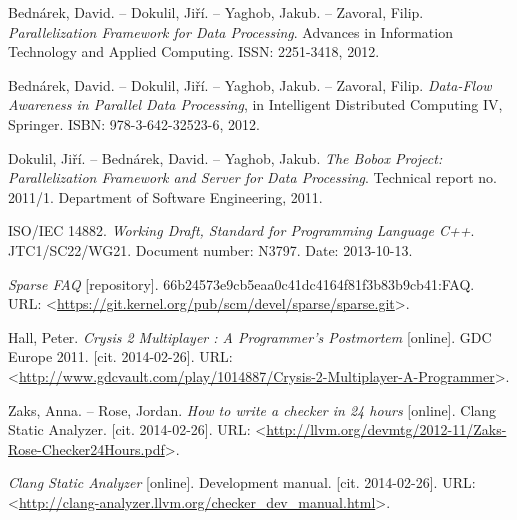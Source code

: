 
\def\bibname{References}
\begin{thebibliography}{99}
\addcontentsline{toc}{chapter}{\bibname}


	{\sc Bednárek}, David. -- {\sc Dokulil}, Jiří. -- {\sc Yaghob}, Jakub. -- {\sc Zavoral}, Filip.
	\emph{Parallelization Framework for Data Processing}.
	Advances in Information Technology and Applied Computing.
	ISSN: 2251-3418, 2012.
	
	{\sc Bednárek}, David. -- {\sc Dokulil}, Jiří. -- {\sc Yaghob}, Jakub. -- {\sc Zavoral}, Filip.
	\emph{Data-Flow Awareness in Parallel Data Processing},
	in Intelligent Distributed Computing IV, Springer.
	ISBN: 978-3-642-32523-6, 2012.

	{\sc Dokulil}, Jiří. -- {\sc Bednárek}, David. -- {\sc Yaghob}, Jakub.
	\emph{The Bobox Project: Parallelization Framework and Server for Data Processing}.
	Technical report no. 2011/1.
	Department of Software Engineering, 2011.
	
	ISO/IEC 14882.
	\emph{Working Draft, Standard for Programming Language C++}.
	JTC1/SC22/WG21.
	Document number: N3797.
	Date: 2013-10-13.
	
	\emph{Sparse FAQ} [repository].
	66b24573e9cb5eaa0c41dc4164f81f3b83b9cb41:FAQ.
	URL: <\url{https://git.kernel.org/pub/scm/devel/sparse/sparse.git}>.
	
	{\sc Hall}, Peter.
	\emph{Crysis 2 Multiplayer : A Programmer's Postmortem} [online].
	GDC Europe 2011.
	[cit. 2014-02-26].
	URL: <\url{http://www.gdcvault.com/play/1014887/Crysis-2-Multiplayer-A-Programmer}>.
	
	{\sc Zaks}, Anna. -- {\sc Rose}, Jordan.
	\emph{How to write a checker in 24 hours} [online].
	Clang Static Analyzer.
	[cit. 2014-02-26].
	URL: <\url{http://llvm.org/devmtg/2012-11/Zaks-Rose-Checker24Hours.pdf}>.
	
	\emph{Clang Static Analyzer} [online].
	Development manual.
	[cit. 2014-02-26].
	URL: <\url{http://clang-analyzer.llvm.org/checker_dev_manual.html}>.
	

\end{thebibliography}
